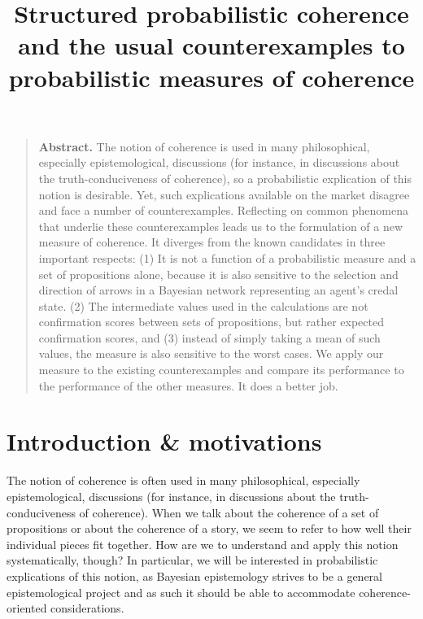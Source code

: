 \documentclass[
  10pt,
]{scrartcl}
\title{Structured probabilistic coherence \linebreak and the usual counterexamples to probabilistic measures of coherence}
\author{}
\date{\vspace{-2.5em}}
\begin{document}
\maketitle

\setlength{\abovedisplayskip}{-10pt}
\setlength{\belowdisplayskip}{5pt}

\begin{quote}\textbf{Abstract.}
The notion of coherence is  used in many philosophical, especially epistemological, discussions (for instance, in discussions  about the  truth-conduciveness of coherence), so a probabilistic explication of this  notion is desirable.  Yet,  such explications available on the market disagree and  face a number of counterexamples.  Reflecting on common phenomena that underlie these counterexamples leads  us to the formulation of  a new measure of coherence. It  diverges from the known candidates in three important respects: (1) It is not a function of a probabilistic measure and a set of propositions alone, because it is also sensitive to the selection and direction of arrows in a Bayesian network representing an agent's credal state. (2) The intermediate values used in the calculations are not confirmation scores between sets of propositions, but rather expected confirmation scores, and (3) instead of simply taking a mean of such values, the measure is also   sensitive to the   worst cases.  We apply our measure to the existing counterexamples and compare its performance to the performance of the other measures. It does a  better job.  
\end{quote}

\hypertarget{introduction-motivations}{%
\section{Introduction \& motivations}\label{introduction-motivations}}

The notion of coherence is often used in many philosophical, especially epistemological, discussions (for instance, in discussions about the truth-conduciveness of coherence). When we talk about the coherence of a set of propositions or about the coherence of a story, we seem to refer to how well their individual pieces fit together. How are we to understand and apply this notion systematically, though? In particular, we will be interested in probabilistic explications of this notion, as Bayesian epistemology strives to be a general epistemological project and as such it should be able to accommodate coherence-oriented considerations.
\end{document}
